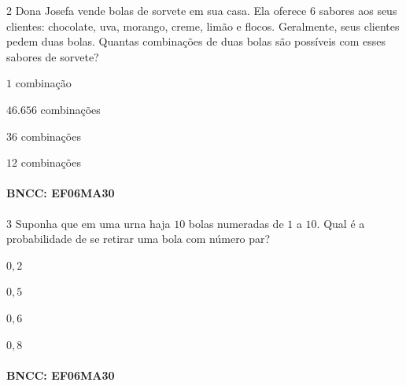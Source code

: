 {\num{2}  Dona Josefa vende bolas de sorvete em sua casa. Ela oferece $6$ sabores
aos seus clientes: chocolate, uva, morango, creme, limão e flocos.
Geralmente, seus clientes pedem duas bolas. Quantas combinações de duas
bolas são possíveis com esses sabores de sorvete?

\begin{escolha}
\item $1$ combinação
\item $46.656$ combinações
\item $36$ combinações
\item $12$ combinações
\end{escolha}

\paragraph{BNCC: EF06MA30 }


\num{3}  Suponha que em uma urna haja $10$ bolas numeradas de $1$ a $10$. Qual é a
probabilidade de se retirar uma bola com número par?

\begin{escolha}
\item $0,2$
\item $0,5$
\item $0,6$
\item $0,8$
\end{escolha}

\paragraph{BNCC: EF06MA30 }

}
